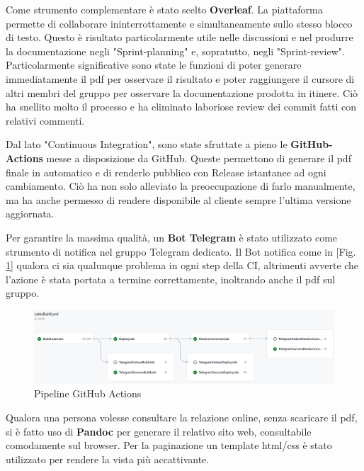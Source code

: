         Come strumento complementare è stato scelto \textbf{Overleaf}. La piattaforma permette di collaborare ininterrottamente e simultaneamente sullo stesso blocco di testo. Questo è risultato particolarmente utile nelle discussioni e nel produrre la documentazione negli "Sprint-planning" e, sopratutto, negli "Sprint-review". Particolarmente significative sono state le funzioni di poter generare immediatamente il pdf per osservare il risultato e poter raggiungere il cursore di altri membri del gruppo per osservare la documentazione prodotta in itinere. Ciò ha snellito molto il processo e ha eliminato laboriose review dei commit fatti con relativi commenti.  

        Dal lato "Continuous Integration", sono state sfruttate a pieno le \textbf{GitHub-Actions} messe a disposizione da GitHub. Queste permettono di generare il pdf finale in automatico e di renderlo pubblico con Release istantanee ad ogni cambiamento. Ciò ha non solo alleviato la preoccupazione di farlo manualmente, ma ha anche permesso di rendere disponibile al cliente sempre l'ultima versione aggiornata. 

        Per garantire la massima qualità, un \textbf{Bot Telegram} è stato utilizzato come strumento di notifica nel gruppo Telegram dedicato. Il Bot notifica come in [Fig. \ref{fig:ci-github}] qualora ci sia qualunque problema in ogni step della CI, altrimenti avverte che l'azione è stata portata a termine correttamente, inoltrando anche il pdf sul gruppo. 

        \begin{figure}[H]
            \caption{Pipeline GitHub Actions}
            \label{fig:ci-github}
            \centering
            \includegraphics[width=1\textwidth]{Images/gh-pipeline.png}
        \end{figure}

        Qualora una persona volesse consultare la relazione online, senza scaricare il pdf, si è fatto uso di \textbf{Pandoc} per generare il relativo sito web, consultabile comodamente sul browser. Per la paginazione un template html/css è stato utilizzato per rendere la vista più accattivante.

